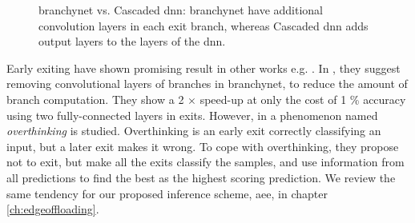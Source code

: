 \begin{figure}
	\caption[\gls{branchynet} vs. Cascaded \gls{dnn}]{\gls{branchynet} vs. Cascaded \gls{dnn}: \protect{} \gls{branchynet} have additional convolution layers in each exit branch, whereas \protect{} Cascaded \gls{dnn} adds output layers to the layers of the \gls{dnn}.}
	\label{fig:cascaded-vs-branchy}
\end{figure}

Early exiting have shown promising result in other works e.g. \cite{kaya_shallow-deep_nodate, berestizshevsky_sacrificing_2019,panda_conditional_2016}. In \cite{berestizshevsky_sacrificing_2019}, they suggest removing convolutional layers of branches in \gls{branchynet}, to reduce the amount of branch computation. They show a 2 $ \times $ speed-up at only the cost of 1 \% accuracy using two fully-connected layers in exits.
However, in \cite{kaya_shallow-deep_nodate}  a phenomenon named \emph{overthinking} is studied. Overthinking is an early exit correctly classifying an input, but a later exit makes it wrong. To cope with overthinking, they propose not to exit, but make all the exits classify the samples, and use information from all predictions to find the best as the highest scoring prediction. We review the same tendency for our proposed inference scheme, \gls{aee}, in chapter \ref{ch:edgeoffloading}.


